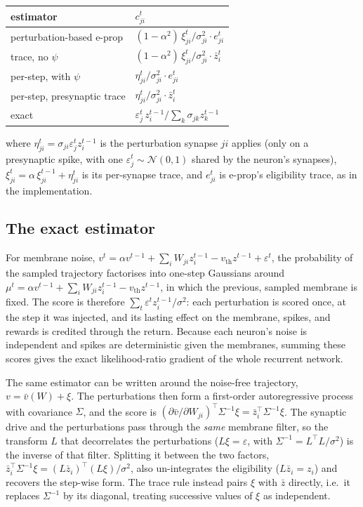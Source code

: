 \documentclass[10pt,twocolumn]{article}
\newcommand{\method}{perturbation-based e-prop}   %
\begin{document}
\begin{center}
\footnotesize
\begin{tabular}{@{}ll@{}}
\toprule
estimator & $c^t_{ji}$ \\
\midrule
\method{} & $(1-\alpha^2)\,\xi^t_{ji}/\sigma_{ji}^2\cdot e^t_{ji}$ \\
trace, no $\psi$ & $(1-\alpha^2)\,\xi^t_{ji}/\sigma_{ji}^2\cdot \bar z^t_i$ \\
per-step, with $\psi$ & $\eta^t_{ji}/\sigma_{ji}^2\cdot e^t_{ji}$ \\
per-step, presynaptic trace & $\eta^t_{ji}/\sigma_{ji}^2\cdot \bar z^t_i$ \\
exact & $\varepsilon^t_j\, z^{t-1}_i \big/ \textstyle\sum_k \sigma_{jk} z^{t-1}_k$ \\
\bottomrule
\end{tabular}
\end{center}

\noindent where $\eta^t_{ji}=\sigma_{ji}\varepsilon^t_j z^{t-1}_i$ is the
perturbation synapse $ji$ applies (only on a presynaptic spike, with one
$\varepsilon^t_j\sim\mathcal N(0,1)$ shared by the neuron's synapses),
$\xi^t_{ji}=\alpha\,\xi^{t-1}_{ji}+\eta^t_{ji}$ is its per-synapse trace, and
$e^t_{ji}$ is e-prop's eligibility trace, as in the implementation.

\subsection{The exact estimator}
\label{app:trace-exact}

For membrane noise, $v^t=\alpha v^{t-1}+\sum_i W_{ji}z^{t-1}_i-v_{\mathrm{th}}z^{t-1}+\varepsilon^t$,
the probability of the sampled trajectory factorises into one-step Gaussians
around $\mu^t=\alpha v^{t-1}+\sum_iW_{ji}z^{t-1}_i-v_{\mathrm{th}}z^{t-1}$, in
which the previous, sampled membrane is fixed. The score is therefore
$\sum_t\varepsilon^t z^{t-1}_i/\sigma^2$: each perturbation is scored once,
at the step it was injected, and its lasting effect on the membrane, spikes,
and rewards is credited through the return. Because each neuron's noise is
independent and spikes are deterministic given the membranes, summing these
scores gives the exact likelihood-ratio gradient of the whole recurrent
network.

The same estimator can be written around the noise-free trajectory,
$v=\bar v(W)+\xi$. The perturbations then form a first-order autoregressive
process with covariance $\Sigma$, and the score is
$(\partial\bar v/\partial W_{ji})^{\!\top}\Sigma^{-1}\xi=\bar z_i^{\top}\Sigma^{-1}\xi$.
The synaptic drive and the perturbations pass through the \emph{same} membrane
filter, so the transform $L$ that decorrelates the perturbations
($L\xi=\varepsilon$, with $\Sigma^{-1}=L^{\top}L/\sigma^2$) is the inverse of
that filter. Splitting it between the two factors,
$\bar z_i^{\top}\Sigma^{-1}\xi=(L\bar z_i)^{\top}(L\xi)/\sigma^2$, also
un-integrates the eligibility ($L\bar z_i=z_i$) and recovers the step-wise form.
The trace rule instead pairs $\xi$ with $\bar z$ directly, i.e.\ it replaces
$\Sigma^{-1}$ by its diagonal, treating successive values of $\xi$ as
independent.
\end{document}
